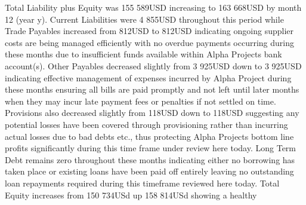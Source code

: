 Total Liability plus Equity was 155 589USD increasing to 163 668USD by month 12 (year y). Current Liabilities were 4 855USD throughout this period while Trade Payables increased from 812USD to 812USD indicating ongoing supplier costs are being managed efficiently with no overdue payments occurring during these months due to insufficient funds available within Alpha Projects bank account(s). Other Payables decreased slightly from 3 925USD down to 3 925USD indicating effective management of expenses incurred by Alpha Project during these months ensuring all bills are paid promptly and not left until later months when they may incur late payment fees or penalties if not settled on time. Provisions also decreased slightly from 118USD down to 118USD suggesting any potential losses have been covered through provisioning rather than incurring actual losses due to bad debts etc., thus protecting Alpha Projects bottom line profits significantly during this time frame under review here today. 
Long Term Debt remains zero throughout these months indicating either no borrowing has taken place or existing loans have been paid off entirely leaving no outstanding loan repayments required during this timeframe reviewed here today. Total Equity increases from 150 734USd up 158 814USd showing a healthy